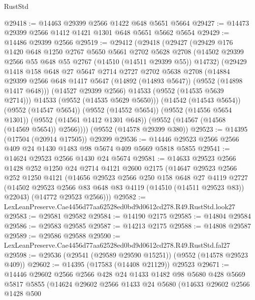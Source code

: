 \begin{lexlean}{RustStd}
\begin{coremodule}
@29418 := @14463 @29399 @2566 @1422 @648 @5651 @5664
@29427 := @14473 @29399 @2566 @1412 @1421 @1301 @648 @5651 @5662 @5654
@29429 := @14486 @29399 @2566
@29519 := @29412
    (@29418
      (@29427
        (@29429
          @176
          @1420
          @648
          @1250
          @2767
          @5650
          @5661
          @2702
          @5628
          @2708
          (@14502 @29399 @2566 @55 @648 @55 @2767 (@14510 (@14511 @29399 @55)) @14732)
          (@29429
            @1418
            @158
            @648
            @27
            @5647
            @2714
            @2727
            @2702
            @5638
            @2708
            (@14884
              @29399
              @2566
              @648
              @1417
              @5647
              (@14892 (@14893 @5647))
              (@9552 (@14898 @1417 @648)))
            (@14527 @29399 @2566)
            @14533
            (@9552 (@14535 @5639 @2714)))
          @14533
          (@9552 (@14535 @5629 @5650)))
        (@14542 (@14543 @5654))
        (@9552 (@14547 @5654))
        (@9552 (@14552 @5654))
        (@9552 (@14556 @5654 @1301))
        (@9552 (@14561 @1412 @1301 @648))
        (@9552 (@14567 (@14568 (@14569 @5654)) @2566))))
    (@9552 (@14578 @29399 @380))
@29523 := @14395 (@17504 (@20914 @17505)) @29399
@29536 := @14446 @29523 @2566 @2566 @409 @24 @1430 @1483 @98 @5674 @409 @5669 @5818 @5855
@29541 := @14624 @29523 @2566 @1430 @24 @5674
@29581 := @14633
    @29523
    @2566
    @1428
    @252
    @1250
    @24
    @2714
    @4121
    @2600
    @2175
    (@14647
      @29523
      @2566
      @252
      @1250
      @4121
      (@14656
        @29523
        @2566
        @250
        @158
        @648
        @27
        @4119
        @2727
        (@14502 @29523 @2566 @83 @648 @83 @4119 (@14510 (@14511 @29523 @83)) @22043)
        (@14772 @29523 @2566)))
@29582 := LexLeanPreserve.Cae4456d77aa62528ed0bd9d0612cd278.R49.RustStd.look27
@29583 := @29581 @29582
@29584 := @14190 @2175
@29585 := @14804 @29584
@29586 := @29583 @29585
@29587 := @14213 @2175
@29588 := @14808 @29587
@29589 := @29586 @29588
@29590 := LexLeanPreserve.Cae4456d77aa62528ed0bd9d0612cd278.R49.RustStd.fal27
@29598 := @29536 (@29541 (@29589 @29590 @15251)) (@9552 (@14578 @29523 @409))
@29602 := @14395 (@17583 (@14408 @21129)) @29523
@29671 := @14446
    @29602
    @2566
    @2566
    @428
    @24
    @1433
    @1482
    @98
    @5680
    @428
    @5669
    @5817
    @5855
    (@14624
      @29602
      @2566
      @1433
      @24
      @5680
      (@14633
        @29602
        @2566
        @1428
        @500

\end{coremodule}
\end{lexlean}
